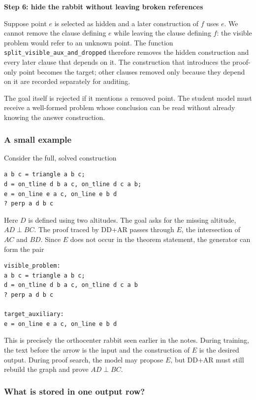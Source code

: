 \documentclass[reqno]{amsart}
\newcommand{\examplepart}[1]{%
    \par\medskip
    \noindent\textbf{\color{agblue}#1}\par\smallskip\noindent
}
\DeclareMathOperator{\1}{\textbf{1}}
\begin{document}
\examplepart{Step 6: hide the rabbit without leaving broken references}

Suppose point $e$ is selected as hidden and a later construction of $f$ uses
$e$. We cannot remove the clause defining $e$ while leaving the clause defining
$f$: the visible problem would refer to an unknown point. The function
\verb|split_visible_aux_and_dropped| therefore removes the hidden
construction and every later clause that depends on it. The construction that
introduces the proof-only point becomes the target; other clauses removed only
because they depend on it are recorded separately for auditing.

The goal itself is rejected if it mentions a removed point. The student model
must receive a well-formed problem whose conclusion can be read without
already knowing the answer construction.

\subsubsection{A small example}

Consider the full, solved construction
\begin{lstlisting}
a b c = triangle a b c;
d = on_tline d b a c, on_tline d c a b;
e = on_line e a c, on_line e b d
? perp a d b c
\end{lstlisting}
Here $D$ is defined using two altitudes. The goal asks for the missing altitude,
$AD\perp BC$. The proof traced by DD+AR passes through $E$, the intersection of
$AC$ and $BD$. Since $E$ does not occur in the theorem statement, the generator
can form the pair
\begin{lstlisting}
visible_problem:
a b c = triangle a b c;
d = on_tline d b a c, on_tline d c a b
? perp a d b c

target_auxiliary:
e = on_line e a c, on_line e b d
\end{lstlisting}
This is precisely the orthocenter rabbit seen earlier in the notes. During
training, the text before the arrow is the input and the construction of $E$
is the desired output. During proof search, the model may propose $E$, but
DD+AR must still rebuild the graph and prove $AD\perp BC$.

\subsubsection{What is stored in one output row?}
\end{document}
